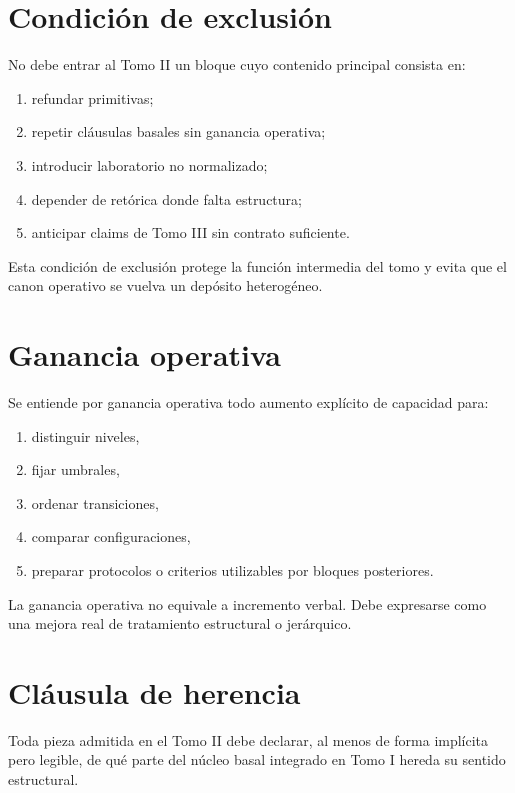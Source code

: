 \section{Condición de exclusión}
\begin{definition}
No debe entrar al Tomo II un bloque cuyo contenido principal consista en:
\begin{enumerate}
  \item refundar primitivas;
  \item repetir cláusulas basales sin ganancia operativa;
  \item introducir laboratorio no normalizado;
  \item depender de retórica donde falta estructura;
  \item anticipar claims de Tomo III sin contrato suficiente.
\end{enumerate}
\end{definition}

\begin{observation}
Esta condición de exclusión protege la función intermedia del tomo y evita que el canon operativo se vuelva un depósito heterogéneo.
\end{observation}

\section{Ganancia operativa}
\begin{definition}
Se entiende por ganancia operativa todo aumento explícito de capacidad para:
\begin{enumerate}
  \item distinguir niveles,
  \item fijar umbrales,
  \item ordenar transiciones,
  \item comparar configuraciones,
  \item preparar protocolos o criterios utilizables por bloques posteriores.
\end{enumerate}
\end{definition}

\begin{observation}
La ganancia operativa no equivale a incremento verbal. Debe expresarse como una mejora real de tratamiento estructural o jerárquico.
\end{observation}

\section{Cláusula de herencia}
\begin{observation}
Toda pieza admitida en el Tomo II debe declarar, al menos de forma implícita pero legible, de qué parte del núcleo basal integrado en Tomo I hereda su sentido estructural.
\end{observation}

